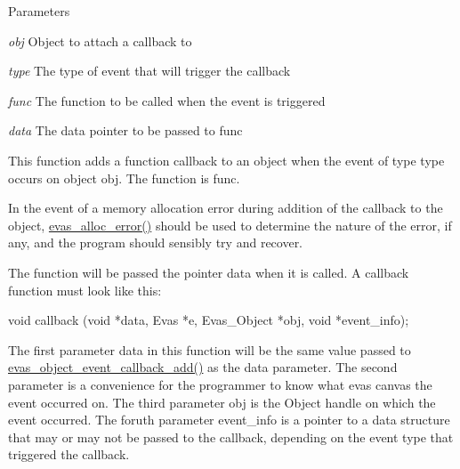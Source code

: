 \begin{DoxyParams}{Parameters}
\item[{\em obj}]Object to attach a callback to \item[{\em type}]The type of event that will trigger the callback \item[{\em func}]The function to be called when the event is triggered \item[{\em data}]The data pointer to be passed to {\ttfamily func} \end{DoxyParams}
This function adds a function callback to an object when the event of type {\ttfamily type} occurs on object {\ttfamily obj}. The function is {\ttfamily func}.

In the event of a memory allocation error during addition of the callback to the object, \hyperlink{group__Evas__Group_ga1c782b4511e3b8678a2166c651053ac9}{evas\_\-alloc\_\-error()} should be used to determine the nature of the error, if any, and the program should sensibly try and recover.

The function will be passed the pointer {\ttfamily data} when it is called. A callback function must look like this:


\begin{DoxyCode}
 void callback (void *data, Evas *e, Evas_Object *obj, void *event_info);
\end{DoxyCode}


The first parameter {\ttfamily data} in this function will be the same value passed to \hyperlink{group__Evas__Object__Group__Events_ga0147a80fc21895dc40165f208ec8cf55}{evas\_\-object\_\-event\_\-callback\_\-add()} as the {\ttfamily data} parameter. The second parameter is a convenience for the programmer to know what evas canvas the event occurred on. The third parameter {\ttfamily obj} is the Object handle on which the event occurred. The foruth parameter {\ttfamily event\_\-info} is a pointer to a data structure that may or may not be passed to the callback, depending on the event type that triggered the callback.

